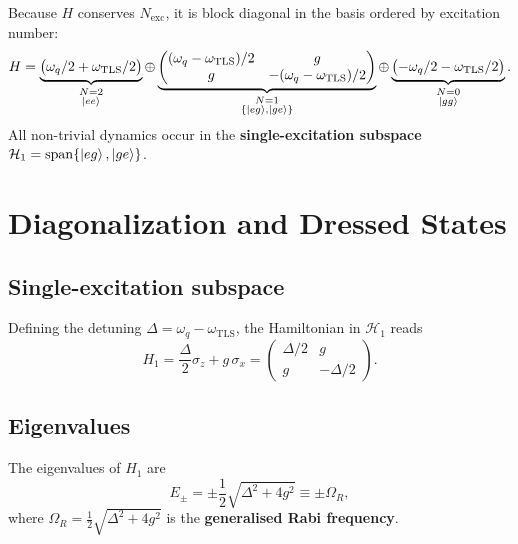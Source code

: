 \documentclass[12pt,a4paper]{article}
\newcommand{\wq}{\omega_q}
\newcommand{\wt}{\omega_{\mathrm{TLS}}}
\newcommand{\D}{\Delta}
\begin{document}
Because $H$ conserves $N_{\mathrm{exc}}$, it is block diagonal in the
basis ordered by excitation number:
\begin{equation}
  H =
  \underbrace{
    \begin{pmatrix} \wq/2 + \wt/2 \end{pmatrix}
  }_{\substack{N=2\\\ket{ee}}}
  \oplus
  \underbrace{
    \begin{pmatrix}
      (\wq - \wt)/2 & g \\
      g & -(\wq-\wt)/2
    \end{pmatrix}
  }_{\substack{N=1\\\{\ket{eg},\ket{ge}\}}}
  \oplus
  \underbrace{
    \begin{pmatrix} -\wq/2 - \wt/2 \end{pmatrix}
  }_{\substack{N=0\\\ket{gg}}}.
  \label{eq:H_block}
\end{equation}
All non-trivial dynamics occur in the \textbf{single-excitation subspace}
$\mathcal{H}_1 = \mathrm{span}\{\ket{eg},\ket{ge}\}$.

\section{Diagonalization and Dressed States}

\subsection{Single-excitation subspace}

Defining the detuning $\D = \wq - \wt$, the Hamiltonian in
$\mathcal{H}_1$ reads
\begin{equation}
  H_1 = \frac{\D}{2}\sigma_z + g\,\sigma_x
      = \begin{pmatrix} \D/2 & g \\ g & -\D/2 \end{pmatrix}.
  \label{eq:H1}
\end{equation}

\subsection{Eigenvalues}

The eigenvalues of $H_1$ are
\begin{equation}
  E_\pm = \pm\frac{1}{2}\sqrt{\D^2 + 4g^2} \equiv \pm\Omega_R,
  \label{eq:eigenvalues}
\end{equation}
where $\Omega_R = \tfrac{1}{2}\sqrt{\D^2 + 4g^2}$ is the
\textbf{generalised Rabi frequency}.
\end{document}
